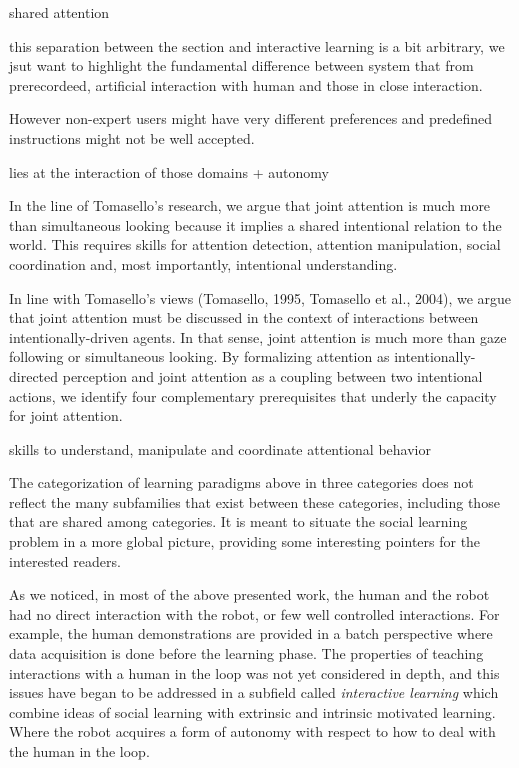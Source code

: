 \transition

shared attention

this separation between the section and interactive learning is a bit arbitrary, we jsut want to highlight the fundamental difference between system that from prerecordeed, artificial interaction with human and those in close interaction.

However non-expert users might have very
different preferences and predefined instructions might not be
well accepted.

lies at the interaction of those domains + autonomy

In the line of Tomasello's research, we argue that joint attention is much more than simultaneous looking because it implies a shared intentional relation to the world. This requires skills for attention detection, attention manipulation, social coordination and, most importantly, intentional understanding.

In line with Tomasello's views (Tomasello, 1995, Tomasello et al., 2004), we argue that joint attention must be discussed in the context of interactions between intentionally-driven agents. In that sense, joint attention is much more than gaze following or simultaneous looking. By formalizing attention as intentionally-directed perception and joint attention as a coupling between two intentional actions, we identify four complementary prerequisites that underly the capacity for joint attention. \cite{kaplan2006challenges}

skills to understand, manipulate and coordinate attentional behavior 



The categorization of learning paradigms above in three categories does not reflect the many subfamilies that exist between these categories, including those that are shared among categories. It is meant to situate the social learning problem in a more global picture, providing some interesting pointers for the interested readers. 

As we noticed, in most of the above presented work, the human and the robot had no direct interaction with the robot, or few well controlled interactions. For example, the human demonstrations are provided in a batch perspective where data acquisition is done
before the learning phase. The properties of teaching interactions with a human in the loop was not yet considered in depth, and this issues have began to be addressed in a subfield called \emph{interactive learning}  which combine ideas of social learning with extrinsic and intrinsic motivated learning. Where the robot acquires a form of autonomy with respect to how to deal with the human in the loop.

